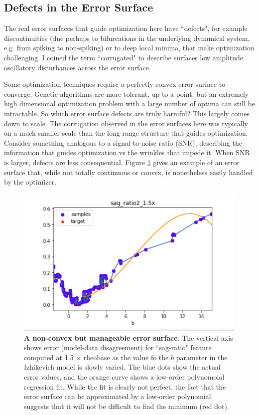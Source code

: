 \subsection{Defects in the Error Surface}
The real error surfaces that guide optimization here have ``defects", for example discontinuities (due perhaps to bifurcations in the underlying dynamical system, e.g. from spiking to non-spiking) or to deep local minima, that make optimization challenging.
I coined the term ``corrugated" to describe surfaces low amplitude oscillatory disturbances across the error surface.

Some optimization techniques require a perfectly convex error surface to converge.
Genetic algorithms are more tolerant, up to a point, but an extremely high dimensional optimization problem with a large number of optima can still be intractable.
So which error surface defects are truly harmful?
This largely comes down to scale.
The corrugation observed in the error surfaces here was typically on a much smaller scale than the long-range structure that guides optimization.
Consider something analogous to a signal-to-noise ratio (SNR), describing the information that guides optimization vs the wrinkles that impede it.
When SNR is larger, defects are less consequential.
Figure \ref{fig:easy-case} gives an example of an error surface that, while not totally continuous or convex, is nonetheless easily handled by the optimizer.

\begin{figure}      
\centering
      \includegraphics[scale=0.85]{figures/parameter_b_friendly_surface.png}
      \caption[A non-convex but manageable error surface]{\textbf{A non-convex but manageable error surface}.
      The vertical axis shows error (model-data disagreement) for ``sag-ratio" feature computed at 1.5 $\times$ rheobase as the value fo the $b$ parameter in the Izhikevich model is slowly varied.
      The blue dots show the actual error values, and the orange curve shows a low-order polynomoial regression fit.
      While the fit is clearly not perfect, the fact that the error surface can be approximated by a low-order polynomial suggests that it will not be difficult to find the minimum (red dot).}
      \label{fig:easy-case}
\end{figure}

